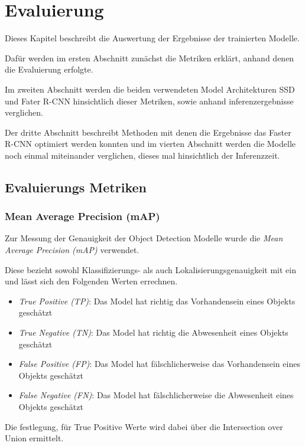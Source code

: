 \chapter{Evaluierung}\label{kap:eval}

Dieses Kapitel beschreibt die Auswertung der
Ergebnisse der trainierten Modelle.

Dafür werden im ersten Abschnitt zunächst die Metriken 
erklärt, anhand denen die Evaluierung erfolgte. 

Im zweiten Abschnitt werden die beiden verwendeten Model
Architekturen SSD und Fater R-CNN hinsichtlich dieser Metriken, sowie anhand 
inferenzergebnisse verglichen.

Der dritte Abschnitt beschreibt Methoden mit denen 
die Ergebnisse das Faster R-CNN optimiert werden konnten und im 
vierten Abschnitt werden die Modelle noch einmal miteinander
verglichen, dieses mal hinsichtlich der Inferenzzeit.

\section{Evaluierungs Metriken}\label{sec:metricen}

\subsection*{Mean Average Precision (mAP)}

Zur Messung der Genauigkeit der Object Detection Modelle 
wurde die \textit{Mean Average Precision (mAP)} verwendet.

Diese bezieht sowohl Klassifizierungs- als auch Lokalisierungsgenauigkeit 
mit ein und lässt sich den Folgenden Werten errechnen.

\begin{itemize}
  \item \textit{True Positive (TP)}: Das Model hat richtig das Vorhandensein eines Objekts geschätzt
  \item \textit{True Negative (TN)}: Das Model hat richtig die Abwesenheit eines Objekts geschätzt
  \item \textit{False Positive (FP)}: Das Model hat fälschlicherweise das Vorhandensein eines Objekts geschätzt
  \item \textit{False Negative (FN)}: Das Model hat fälschlicherweise die Abwesenheit eines Objekts geschätzt
\end{itemize}

Die festlegung, für True Positive Werte wird dabei über die 
Intersection over Union ermittelt.

